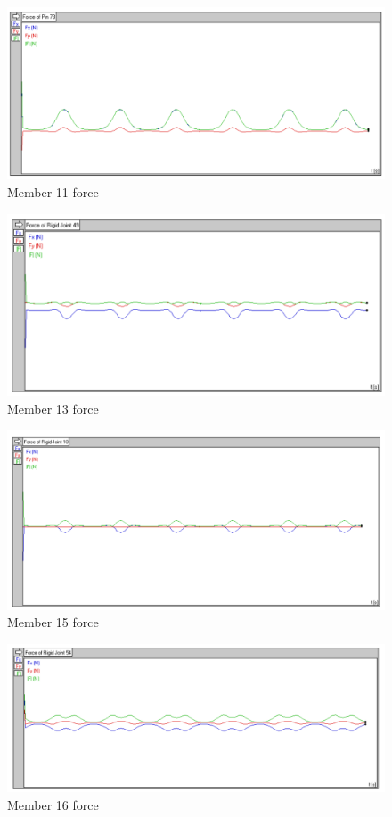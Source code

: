 \documentclass{article}
\begin{document}
\begin{figure}[H]
    \centering
    \includegraphics[width=0.7\linewidth]{Images/mem 11.png}
    \caption{Member 11 force}
\end{figure}

\begin{figure}[H]
    \centering
    \includegraphics[width=0.7\linewidth]{Images/mem 13.png}
    \caption{Member 13 force}
\end{figure}

\begin{figure}[H]
    \centering
    \includegraphics[width=0.7\linewidth]{Images/mem 15.png}
    \caption{Member 15 force}
\end{figure}

\begin{figure}[H]
    \centering
    \includegraphics[width=0.7\linewidth]{Images/mem 16.png}
    \caption{Member 16 force}
\end{figure}
\end{document}

